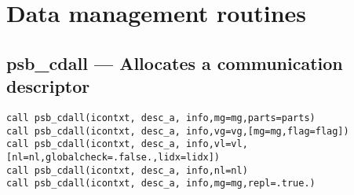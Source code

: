 \section{Data management routines}
\label{sec:toolsrout}


%
%
\subsection*{psb\_cdall --- Allocates a communication descriptor}

\begin{verbatim}
call psb_cdall(icontxt, desc_a, info,mg=mg,parts=parts)
call psb_cdall(icontxt, desc_a, info,vg=vg,[mg=mg,flag=flag])
call psb_cdall(icontxt, desc_a, info,vl=vl,[nl=nl,globalcheck=.false.,lidx=lidx])
call psb_cdall(icontxt, desc_a, info,nl=nl)
call psb_cdall(icontxt, desc_a, info,mg=mg,repl=.true.)
\end{verbatim}

